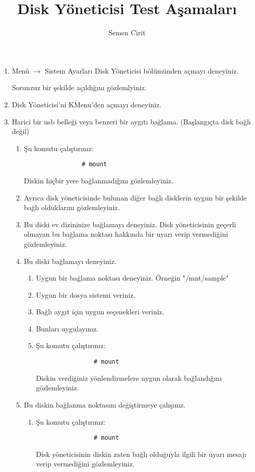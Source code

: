 \documentclass[a4paper,10pt]{article}
\title{Disk Yöneticisi Test Aşamaları}
\author{Semen Cirit}
\begin{document}
\maketitle
\begin{enumerate}

\item Menü $\rightarrow$ Sistem Ayarları Disk Yöneticisi bölümünden açmayı deneyiniz.

Sorunzuz bir şekilde açıldığını gözlemlyiniz.
\item Disk Yöneticisi'ni KMenu'den açmayı deneyiniz.

\item Harici bir usb belleği veya benzeri bir aygıtı bağlama. (Başlangıçta disk bağlı değil) 
    \begin{enumerate}
        \item Şu komutu çalıştırınız:
            \begin{verbatim}
                # mount
            \end{verbatim}
            Diskin hiçbir yere bağlanmadığını gözlemleyiniz. 

	\item Ayrıca disk yöneticisinde bulunan diğer bağlı disklerin uygun bir şekilde bağlı olduklarını gözlemleyiniz.  

    \item Bu diski ev dizininize bağlamayı deneyiniz.
          Disk yöneticisinin geçerli olmayan bu bağlama noktası hakkında bir uyarı verip vermediğini gözlemleyiniz.
    \item Bu diski bağlamayı deneyiniz.
        \begin{enumerate}
            \item Uygun bir bağlama noktası deneyiniz. Örneğin "/mnt/sample"
            \item Uygun bir dosya sistemi veriniz.
            \item Bağlı aygıt için uygun seçenekleri veriniz.
            \item Bunları uygulayınız.
            \item Şu komutu çalıştırınız:
            \begin{verbatim}
                # mount
            \end{verbatim}
                Diskin verdiğiniz yönlendirmelere uygun olarak bağlandığını gözlemleyiniz.
        \end{enumerate}

    \item Bu diskin bağlanma noktasını değiştirmeye çalışınız.
        \begin{enumerate}
            \item Şu komutu çalıştırınız:
            \begin{verbatim}
                # mount
            \end{verbatim}
            Disk yöneticisinin diskin zaten bağlı olduğuyla ilgili bir uyarı mesajı verip vermediğini gözlemleyiniz.
        \end{enumerate}


\end{enumerate}
\end{enumerate}
\end{document}
